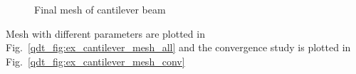 %
    \begin{figure}
        \centering
        \caption[Final mesh of cantilever beam]{Final mesh of cantilever beam}
        \label{qdt_fig:ex_cantilever_beam_mesh_final}
    \end{figure}
Mesh with different parameters are plotted in Fig.~\ref{qdt_fig:ex_cantilever_mesh_all} and the convergence study is plotted in Fig.~\ref{qdt_fig:ex_cantilever_mesh_conv}
%
